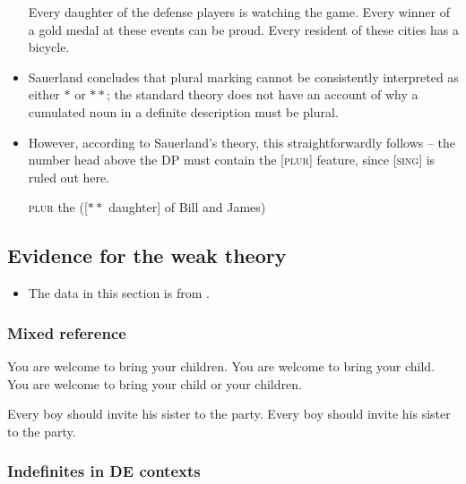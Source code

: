 \documentclass[landscape,twocolumn,cronos,paper=letter]{ling-handout}
\begin{document}
\begin{itemize}
            \pex
            \a Every daughter of the defense players is watching the game.
            \a Every winner of a gold medal at these events can be proud.
            \a Every resident of these cities has a bicycle.
            \xe

         \item Sauerland concludes that plural marking cannot be consistently
            interpreted as either $*$ or $**$; the standard theory does not have
            an account of why a cumulated noun in a definite description must be
            plural.

            \item However, according to Sauerland's theory, this
            straightforwardly follows -- the number head above the DP must
            contain the [\textsc{plur}] feature, since [\textsc{sing}] is ruled
            out here.

            \ex
            \textsc{plur} the ([$**$ daughter] of Bill and James)
            \xe

        \end{itemize}

        \subsection{Evidence for the weak theory}

        \begin{itemize}

            \item The data in this section is from \citet{sauerlandAnderssenYatsushiro2005}.

        \end{itemize}

        \subsubsection{Mixed reference}

        \pex
        \a You are welcome to bring your children.
        \a\ljudge{\#}You are welcome to bring your child.
        \a You are welcome to bring your child or your children.
        \xe

        \pex
        \a Every boy should invite his sister to the party.
        \a\ljudge{\#}Every boy should invite his sister to the party.
        \xe

        \subsubsection{Indefinites in DE contexts}
\end{document}
